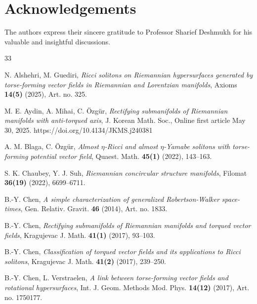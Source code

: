 \documentclass[12pt]{amsart}
\theoremstyle{definition}
\begin{document}
\section*{Acknowledgements}
The authors express their sincere gratitude to Professor Sharief Deshmukh for his valuable and insightful discussions.










\begin{thebibliography}{33}


 N. Alshehri, M. Guediri, {\it Ricci solitons on Riemannian hypersurfaces generated by torse-forming vector fields in Riemannian and Lorentzian manifolds}, Axioms {\bf 14(5)} (2025), Art. no. 325.

 M. E. Aydin, A. Mihai, C. \"Ozg\"ur, {\it Rectifying submanifolds of Riemannian manifolds with anti-torqued axis}, J. Korean Math. Soc., Online first article May 30, 2025. https://doi.org/10.4134/JKMS.j240381

 A. M. Blaga, C. \"Ozg\"ur, {\it Almost $\eta$-Ricci and almost $\eta$-Yamabe solitons with torse-forming potential vector field}, Quaest. Math. {\bf 45(1)} (2022), 143--163.

 S. K. Chaubey, Y. J. Suh, {\it Riemannian concircular structure manifolds}, Filomat {\bf 36(19)} (2022), 6699--6711.


 B.-Y. Chen, {\it A simple characterization of generalized Robertson-Walker space-times}, Gen. Relativ. Gravit. {\bf 46} (2014), Art. no. 1833. 


 B.-Y. Chen, {\it Rectifying submanifolds of Riemannian manifolds and torqued vector fields}, Kragujevac J. Math.
{\bf 41(1)} (2017), 93--103.

 B.-Y. Chen, {\it Classification of torqued vector fields and its applications to Ricci solitons}, Kragujevac J. Math. {\bf 41(2)} (2017), 239--250.

 B.-Y. Chen, L. Verstraelen, {\it A link between torse-forming vector fields and rotational hypersurfaces}, Int. J. Geom. Methods Mod. Phys. {\bf 14(12)} (2017), Art. no. 1750177.






\end{thebibliography}
\end{document}
